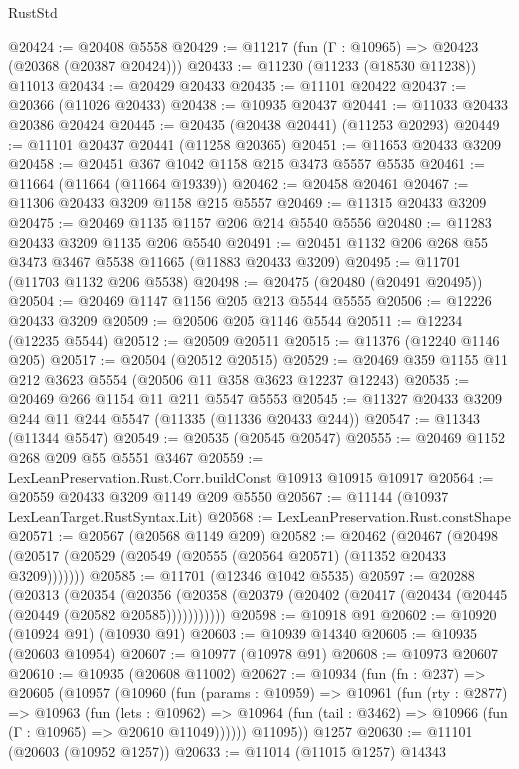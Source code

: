 \begin{lexlean}{RustStd}
\begin{coremodule}
{{{{{{{{{{{{{{{{{{{@20424 := @20408 @5558
@20429 := @11217 (fun (Γ : @10965) => @20423 (@20368 (@20387 @20424)))
@20433 := @11230 (@11233 (@18530 @11238)) @11013
@20434 := @20429 @20433
@20435 := @11101 @20422
@20437 := @20366 (@11026 @20433)
@20438 := @10935 @20437
@20441 := @11033 @20433 @20386 @20424
@20445 := @20435 (@20438 @20441) (@11253 @20293)
@20449 := @11101 @20437 @20441 (@11258 @20365)
@20451 := @11653 @20433 @3209
@20458 := @20451 @367 @1042 @1158 @215 @3473 @5557 @5535
@20461 := @11664 (@11664 (@11664 @19339))
@20462 := @20458 @20461
@20467 := @11306 @20433 @3209 @1158 @215 @5557
@20469 := @11315 @20433 @3209
@20475 := @20469 @1135 @1157 @206 @214 @5540 @5556
@20480 := @11283 @20433 @3209 @1135 @206 @5540
@20491 := @20451 @1132 @206 @268 @55 @3473 @3467 @5538 @11665 (@11883 @20433 @3209)
@20495 := @11701 (@11703 @1132 @206 @5538)
@20498 := @20475 (@20480 (@20491 @20495))
@20504 := @20469 @1147 @1156 @205 @213 @5544 @5555
@20506 := @12226 @20433 @3209
@20509 := @20506 @205 @1146 @5544
@20511 := @12234 (@12235 @5544)
@20512 := @20509 @20511
@20515 := @11376 (@12240 @1146 @205)
@20517 := @20504 (@20512 @20515)
@20529 := @20469 @359 @1155 @11 @212 @3623 @5554 (@20506 @11 @358 @3623 @12237 @12243)
@20535 := @20469 @266 @1154 @11 @211 @5547 @5553
@20545 := @11327 @20433 @3209 @244 @11 @244 @5547 (@11335 (@11336 @20433 @244))
@20547 := @11343 (@11344 @5547)
@20549 := @20535 (@20545 @20547)
@20555 := @20469 @1152 @268 @209 @55 @5551 @3467
@20559 := LexLeanPreservation.Rust.Corr.buildConst @10913 @10915 @10917
@20564 := @20559 @20433 @3209 @1149 @209 @5550
@20567 := @11144 (@10937 LexLeanTarget.RustSyntax.Lit)
@20568 := LexLeanPreservation.Rust.constShape
@20571 := @20567 (@20568 @1149 @209)
@20582 := @20462
    (@20467 (@20498 (@20517 (@20529 (@20549 (@20555 (@20564 @20571) (@11352 @20433 @3209)))))))
@20585 := @11701 (@12346 @1042 @5535)
@20597 := @20288
    (@20313
      (@20354
        (@20356 (@20358 (@20379 (@20402 (@20417 (@20434 (@20445 (@20449 (@20582 @20585)))))))))))
@20598 := @10918 @91
@20602 := @10920 (@10924 @91) (@10930 @91)
@20603 := @10939 @14340
@20605 := @10935 (@20603 @10954)
@20607 := @10977 (@10978 @91)
@20608 := @10973 @20607
@20610 := @10935 (@20608 @11002)
@20627 := @10934
    (fun (fn : @237) =>
    @20605
      (@10957
        (@10960
          (fun (params : @10959) =>
          @10961
            (fun (rty : @2877) =>
            @10963
              (fun (lets : @10962) =>
              @10964 (fun (tail : @3462) => @10966 (fun (Γ : @10965) => @20610 @11049))))))
        @11095))
    @1257
@20630 := @11101 (@20603 (@10952 @1257))
@20633 := @11014 (@11015 @1257) @14343
}}}}}}}}}}}}}}}}}}}
\end{coremodule}
\end{lexlean}
